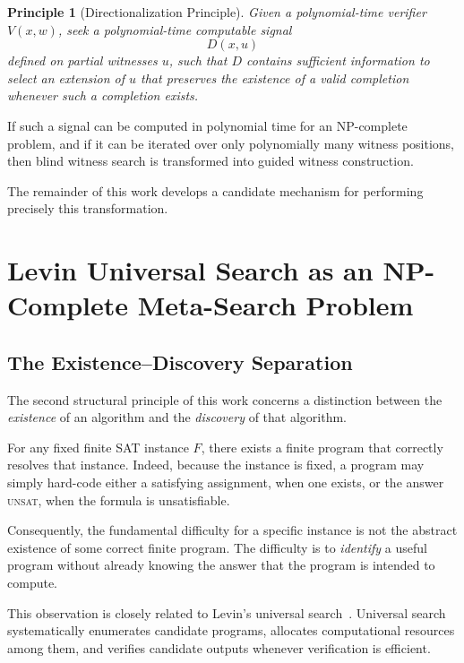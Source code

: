 \documentclass[11pt]{article}
\theoremstyle{plain}
\newtheorem{principle}[theorem]{Principle}
\theoremstyle{definition}
\begin{document}
\begin{principle}[Directionalization Principle]
\label{principle:directionalization}
Given a polynomial-time verifier \(V(x,w)\), seek a polynomial-time computable
signal
\[
    D(x,u)
\]
defined on partial witnesses \(u\), such that \(D\) contains sufficient
information to select an extension of \(u\) that preserves the existence of a
valid completion whenever such a completion exists.
\end{principle}

If such a signal can be computed in polynomial time for an NP-complete
problem, and if it can be iterated over only polynomially many witness
positions, then blind witness search is transformed into guided witness
construction.

The remainder of this work develops a candidate mechanism for performing
precisely this transformation.


\section{Levin Universal Search as an NP-Complete Meta-Search Problem}
\label{sec:levin-meta-search}

\subsection{The Existence--Discovery Separation}

The second structural principle of this work concerns a distinction between
the \emph{existence} of an algorithm and the \emph{discovery} of that
algorithm.

For any fixed finite SAT instance \(F\), there exists a finite program that
correctly resolves that instance.  Indeed, because the instance is fixed, a
program may simply hard-code either a satisfying assignment, when one exists,
or the answer \textsc{unsat}, when the formula is unsatisfiable.

Consequently, the fundamental difficulty for a specific instance is not the
abstract existence of some correct finite program.  The difficulty is to
\emph{identify} a useful program without already knowing the answer that the
program is intended to compute.

This observation is closely related to Levin's universal search~\cite{Levin1973}.  Universal
search systematically enumerates candidate programs, allocates computational
resources among them, and verifies candidate outputs whenever verification is
efficient.
\end{document}

